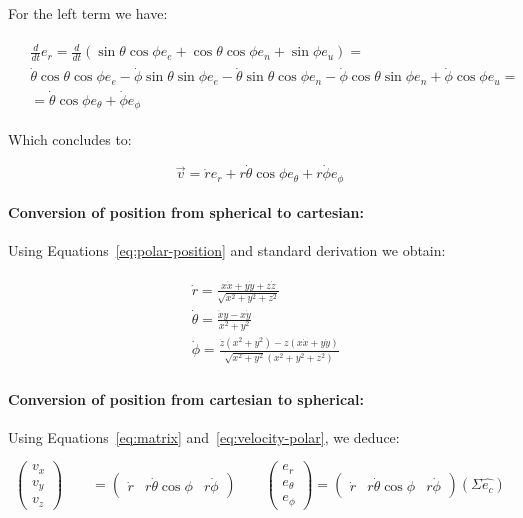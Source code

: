 \documentclass{article}
\newcommand{\east}{e_e}
\newcommand{\north}{e_n}
\newcommand{\up}{e_u}
\newcommand{\range}{e_r}
\newcommand{\bearing}{e_\theta}
\newcommand{\elevation}{e_\phi}
\newcommand{\rrate}{\dot{r}}
\newcommand{\brate}{\dot{\theta}}
\newcommand{\erate}{\dot{\phi}}
\newcommand{\carvec}{\hat{e_{c}}}
\begin{document}
For the left term we have:

\begin{align*}
\begin{split}
& \frac{d}{dt} \range = \frac{d}{dt}(\sin \theta \cos \phi \east + \cos \theta
\cos \phi \north + \sin \phi \up ) =  \\ 
& \brate \cos \theta \cos \phi \east -
\erate \sin \theta \sin \phi \east - \brate \sin \theta \cos \phi \north - \erate \cos
\theta \sin \phi \north + \erate \cos \phi \up = \\
& = \brate \cos \phi \bearing + \erate \elevation 
\end{split}
\end{align*}


Which concludes to:

\begin{equation}\label{eq:velocity-polar}
\vec{v} = \rrate \range + r \brate \cos \phi \bearing + r \erate \elevation 
\end{equation}

\paragraph{Conversion of position from spherical to cartesian:}
Using Equations~\ref{eq:polar-position} and standard derivation we obtain:

\begin{align}
\begin{split}
{}& \rrate= \frac{x\dot{x}+y\dot{y}+z\dot{z}}{\sqrt{x^2 + y^2 + z^2}} \\
{}& \brate= \frac{\dot{x}y-x\dot{y}}{x^2+y^2}
\\
{}& \erate = \frac{\dot{z}(x^2+y^2) - z(x\dot{x}+y\dot{y})}{\sqrt{x^2+y^2}(x^2 +
y^2 + z^2)}
\end{split}
\end{align}

\paragraph{Conversion of position from cartesian to spherical:}
Using Equations~\ref{eq:matrix} and~\ref{eq:velocity-polar}, we deduce:


\begin{equation}\label{eq:car-polar}
\begin{pmatrix}
    v_x \\
   v_y \\
    v_z
  \end{pmatrix}
  \qquad
  = \begin{pmatrix}
    \rrate & r\brate \cos \phi & r\erate
  \end{pmatrix}
  \qquad
  \begin{pmatrix}
    \range \\
   \bearing \\
    \elevation
  \end{pmatrix}
  = \begin{pmatrix}
    \rrate & r\brate \cos \phi & r\erate
  \end{pmatrix} (\Sigma \carvec)
\end{equation}
\end{document}
